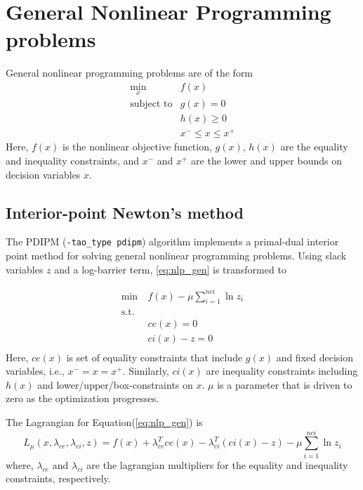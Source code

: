 \section{General Nonlinear Programming problems}
General nonlinear programming problems are of the form
\[
\begin{array}{ll}
\displaystyle \min_{x} & f(x) \\
\mbox{subject to} & g(x) = 0 \\
                  & h(x) \geq 0 \\
                  & x^- \leq x \leq x^+
\end{array}
\label{eq:nlp_gen}
\]
Here, $f(x)$ is the nonlinear objective function, $g(x)$, $h(x)$ are the equality
and inequality constraints, and $x^-$ and $x^+$ are the lower and upper bounds
on decision variables $x$.

\subsection{Interior-point Newton's method}
The PDIPM ({\tt -tao\_type pdipm}) algorithm implements a primal-dual interior point method for solving general
nonlinear programming problems. Using slack variables $z$ and a log-barrier term, \ref{eq:nlp_gen}
is transformed to 

\begin{equation}
    \begin{aligned}
    \text{min}~&f(x) - \mu\sum_{i=1}^{nci}\ln z_i\\
    \text{s.t.}& \\
        &ce(x) = 0 \\
        &ci(x) - z = 0 \\
    \end{aligned}
    \label{eq:nlp_gen}
\end{equation}
Here, $ce(x)$ is set of equality constraints that include $g(x)$ and fixed
decision variables, i.e., $x^- = x = x^+$. Similarly, $ci(x)$ are inequality constraints
including $h(x)$ and lower/upper/box-constraints on $x$.
$\mu$ is a parameter that is driven to zero as the optimization progresses.

The Lagrangian for Equation(\ref{eq:nlp_gen}) is
\begin{equation}
    L_{\mu}(x,\lambda_{ce},\lambda_{ci},z) = f(x) + \lambda_{ce}^Tce(x) - \lambda_{ci}^T(ci(x) - z) - \mu\sum_{i=1}^{nci}\ln z_i
    \label{eq:lagrangian}
\end{equation}
where, $\lambda_{ce}$ and $\lambda_{ci}$ are the lagrangian multipliers for the equality and inequality constraints, respectively.

